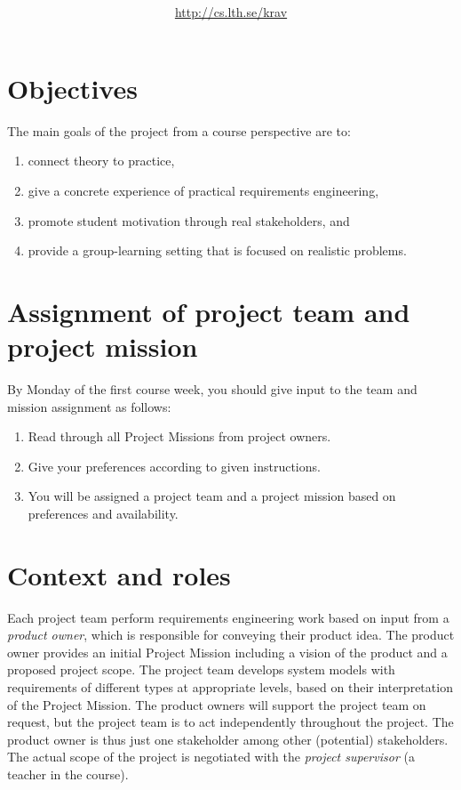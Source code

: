 \documentclass{project}
\title{\bf\sffamily\fontsize{18}{18}\selectfont{
Project~Description~\COURSECODE\\\COURSETITLE
}}
\author{\url{http://cs.lth.se/krav}}
\date{\sffamily\fontsize{10}{10}\selectfont{Revision date: \today}}
\begin{document}
\maketitle
\vspace{-1cm}

\section{Objectives}
The main goals of the project from a course perspective are to:
\begin{enumerate}[nolistsep]
\item connect theory to practice,
\item give a concrete experience of practical requirements engineering,
\item promote student motivation through real stakeholders, and
\item provide a group-learning setting that is focused on realistic problems.
\end{enumerate}

\section{Assignment of project team and project mission}
By Monday of the first course week, you should give input to the team and mission
assignment as follows:
\begin{enumerate}[nolistsep]
\item Read through all Project Missions from project owners.
\item  Give your preferences according to given instructions.
\item  You will be assigned a project team and a project mission based on preferences
and availability.
\end{enumerate}

\section{Context and roles}

\noindent Each project team perform requirements engineering work based on input from a \textit{product owner}, which is responsible for conveying their product idea. The product owner provides an initial Project Mission including a vision of the product and a proposed project scope. The project team develops system models with requirements of different types at appropriate levels, based on their interpretation of the Project Mission. The product owners will support the project team on request, but the project team is to act independently throughout the project. The product owner is thus just one stakeholder among other (potential) stakeholders. The actual scope of the project is negotiated with the \textit{project supervisor} (a teacher in the course).
\end{document}
